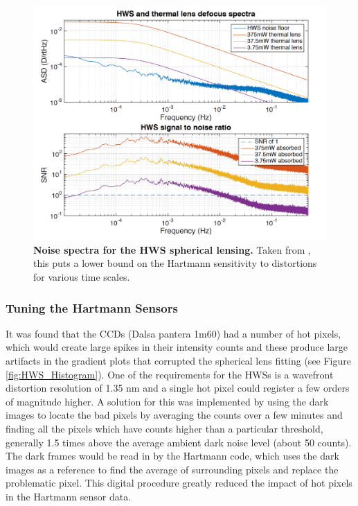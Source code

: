 	\begin{figure}[!]
	\centering
	\includegraphics[width=0.7\textheight]{../Figures/HWS_Noise.PNG}
	\caption[Noise spectra for the HWS spherical lensing.] 
	{\textbf{Noise spectra for the HWS spherical lensing.} Taken from \cite{AWC_current}, this puts a lower bound on the Hartmann sensitivity to distortions for various time scales.}
	\label{fig:HWS_spectra}
	\end{figure}
	
	\subsubsection{Tuning the Hartmann Sensors}
	It was found that the CCDs (Dalsa pantera 1m60) had a number of hot pixels, which would create large spikes in their intensity counts and these produce large artifacts in the gradient plots that corrupted the spherical lens fitting (see Figure \ref{fig:HWS_Histogram}).  One of the requirements for the HWSs is a wavefront distortion resolution of 1.35 nm \cite{AWC_current} and a single hot pixel could register a few orders of magnitude higher.  A solution for this was implemented by using the dark images to locate the bad pixels by averaging the counts over a few minutes and finding all the pixels which have counts higher than a particular threshold, generally 1.5 times above the average ambient dark noise level (about 50 counts).  The dark frames would be read in by the Hartmann code, which uses the dark images as a reference to find the average of surrounding pixels and replace the problematic pixel.  This digital procedure greatly reduced the impact of hot pixels in the Hartmann sensor data.
	
